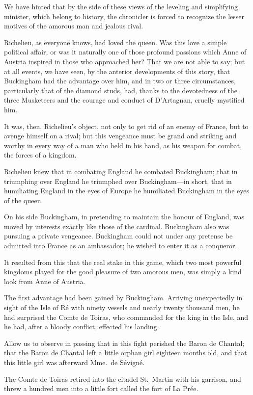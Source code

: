 We have hinted that by the side of these views of the leveling and simplifying minister, which belong to history, the chronicler is forced to recognize the lesser motives of the amorous man and jealous rival. 

Richelieu, as everyone knows, had loved the queen. Was this love a simple political affair, or was it naturally one of those profound passions which Anne of Austria inspired in those who approached her? That we are not able to say; but at all events, we have seen, by the anterior developments of this story, that Buckingham had the advantage over him, and in two or three circumstances, particularly that of the diamond studs, had, thanks to the devotedness of the three Musketeers and the courage and conduct of D'Artagnan, cruelly mystified him. 

It was, then, Richelieu's object, not only to get rid of an enemy of France, but to avenge himself on a rival; but this vengeance must be grand and striking and worthy in every way of a man who held in his hand, as his weapon for combat, the forces of a kingdom. 

Richelieu knew that in combating England he combated Buckingham; that in triumphing over England he triumphed over Buckingham—in short, that in humiliating England in the eyes of Europe he humiliated Buckingham in the eyes of the queen. 

On his side Buckingham, in pretending to maintain the honour of England, was moved by interests exactly like those of the cardinal. Buckingham also was pursuing a private vengeance. Buckingham could not under any pretense be admitted into France as an ambassador; he wished to enter it as a conqueror. 

It resulted from this that the real stake in this game, which two most powerful kingdoms played for the good pleasure of two amorous men, was simply a kind look from Anne of Austria. 

The first advantage had been gained by Buckingham. Arriving unexpectedly in sight of the Isle of Ré with ninety vessels and nearly twenty thousand men, he had surprised the Comte de Toiras, who commanded for the king in the Isle, and he had, after a bloody conflict, effected his landing. 

Allow us to observe in passing that in this fight perished the Baron de Chantal; that the Baron de Chantal left a little orphan girl eighteen months old, and that this little girl was afterward Mme.~de Sévigné. 

The Comte de Toiras retired into the citadel St.~Martin with his garrison, and threw a hundred men into a little fort called the fort of La Prée. 


